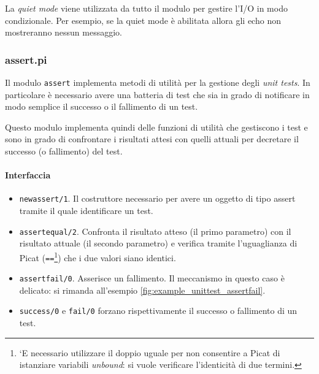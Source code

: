 \documentclass[12pt,a4paper,openright]{book} %
\begin{document}
La \emph{quiet mode} viene utilizzata da tutto il modulo per gestire
l'I/O in modo condizionale. Per esempio, se la quiet mode è abilitata
allora gli echo non mostreranno nessun messaggio.

\subsubsection{assert.pi}

Il modulo \texttt{assert} implementa metodi di utilità per la gestione
degli \emph{unit tests}. In particolare è necessario avere una
batteria di test che sia in grado di notificare in modo semplice il
successo o il fallimento di un test.

Questo modulo implementa quindi delle funzioni di utilità che
gestiscono i test e sono in grado di confrontare i risultati attesi
con quelli attuali per decretare il successo (o fallimento) del test.

\paragraph{Interfaccia}
\begin{itemize}
	\item \texttt{new\textunderscore assert/1}. Il costruttore
          necessario per avere un oggetto di tipo assert tramite il
          quale identificare un test.
	\item \texttt{assert\textunderscore equal/2}. Confronta il
          risultato atteso (il primo parametro) con il risultato
          attuale (il secondo parametro) e verifica tramite
          l'uguaglianza di Picat (\texttt{==}\footnote{`E necessario
            utilizzare il doppio uguale per non consentire a Picat di
            istanziare variabili \emph{unbound}: si vuole verificare
            l'identicità di due termini.}) che i due valori siano
          identici.
	\item \texttt{assert\textunderscore fail/0}. Asserisce un
          fallimento. Il meccanismo in questo caso è delicato: si
          rimanda all'esempio \ref{fig:example_unittest_assertfail}.
	\item \texttt{success/0} e \texttt{fail/0} forzano
          rispettivamente il successo o fallimento di un test.
\end{itemize}
\end{document}
